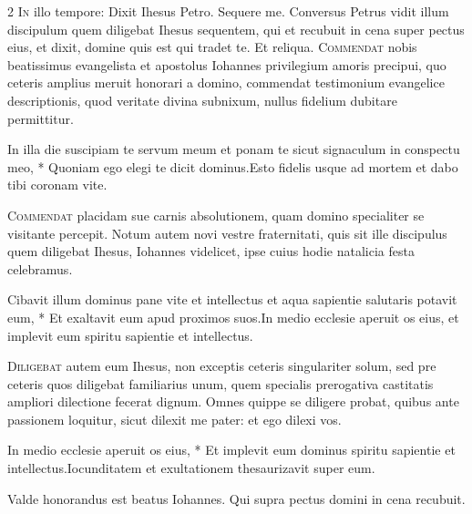 \begin{multicols*}{2}
\lettrine[lines=2]{\zallmancaps \color{Blue} I}{n} illo tempore: Dixit Ihesus Petro. Sequere me. Conversus Petrus vidit illum discipulum quem diligebat Ihesus sequentem, qui et recubuit in cena super pectus eius, et dixit, domine quis est qui tradet te. Et reliqua.
 \grecross
\lettrine[lines=2]{\zallmancaps \color{Red} C}{ommendat} nobis beatissimus evangelista et apostolus Iohannes privilegium amoris precipui, quo ceteris amplius meruit honorari a domino, commendat testimonium evangelice descriptionis, quod veritate divina subnixum, nullus fidelium dubitare permittitur.
\begin{responsory}
{In illa die suscipiam te servum meum et ponam te sicut signaculum in conspectu meo, * Quoniam ego elegi te dicit dominus.}{Esto fidelis usque ad mortem et dabo tibi coronam vite.}
\end{responsory}%
\lettrine[lines=2]{\zallmancaps \color{Blue} C}{ommendat} placidam sue carnis absolutionem, quam domino specialiter se visitante percepit. Notum autem novi vestre fraternitati, quis sit ille discipulus quem diligebat Ihesus, Iohannes videlicet, ipse cuius hodie natalicia festa celebramus.
\begin{responsory}
{Cibavit illum dominus pane vite et intellectus et aqua sapientie salutaris potavit eum, * Et exaltavit eum apud proximos suos.}{In medio ecclesie aperuit os eius, et implevit eum spiritu sapientie et intellectus.}
\end{responsory}%
\lettrine[lines=2]{\zallmancaps \color{Red} D}{iligebat} autem eum Ihesus, non exceptis ceteris singulariter solum, sed pre ceteris quos diligebat familiarius unum, quem specialis prerogativa castitatis ampliori dilectione fecerat dignum. Omnes quippe se diligere probat, quibus ante passionem loquitur, sicut dilexit me pater: et ego dilexi vos.
\begin{responsory-doxology}
{In medio ecclesie aperuit os eius, * Et implevit eum dominus spiritu sapientie et intellectus.}{Iocunditatem et exultationem thesaurizavit super eum.}
\end{responsory-doxology}%
\newline \V Valde honorandus est beatus Iohannes. \R Qui supra pectus domini in cena recubuit.

\end{multicols*}
